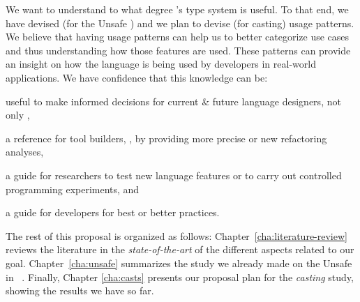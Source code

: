 We want to understand to what degree \java{}'s type system is useful.
To that end, we have devised (for the Unsafe \api{}) and we plan to devise (for casting) usage patterns.
We believe that having usage patterns can help us to better categorize use cases and thus understanding how those features are used.
These patterns can provide an insight on how the language is being used by developers in real-world applications.
We have confidence that this knowledge can be:
\begin{inparaenum}[a)]
\item useful to make informed decisions for current \& future language designers, not only \java{},
\item a reference for tool builders, \eg{}, by providing more precise or new refactoring analyses,
\item a guide for researchers to test new language features or to carry out controlled programming experiments, and
\item a guide for developers for best or better practices.
\end{inparaenum}

The rest of this proposal is organized as follows:
Chapter~\ref{cha:literature-review} reviews the literature in the \emph{state-of-the-art} of the different aspects related to our goal.
Chapter~\ref{cha:unsafe} summarizes the study we already made on the Unsafe \api{} in \java{}~\cite{mastrangeloUseYourOwn2015}.
Finally, Chapter \ref{cha:casts} presents our proposal plan for the \emph{casting} study, showing the results we have so far.
